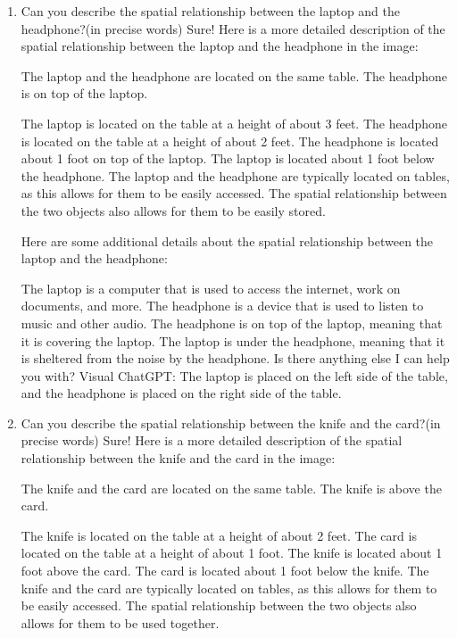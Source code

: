 \begin{enumerate}
    \item Can you describe the spatial relationship between the laptop and the headphone?(in precise words)
    \subitem 
    Sure! Here is a more detailed description of the spatial relationship between the laptop and the headphone in the image:
    
    The laptop and the headphone are located on the same table. The headphone is on top of the laptop.
    
    The laptop is located on the table at a height of about 3 feet.
    The headphone is located on the table at a height of about 2 feet.
    The headphone is located about 1 foot on top of the laptop.
    The laptop is located about 1 foot below the headphone.
    The laptop and the headphone are typically located on tables, as this allows for them to be easily accessed. The spatial relationship between the two objects also allows for them to be easily stored.
    
    Here are some additional details about the spatial relationship between the laptop and the headphone:
    
    The laptop is a computer that is used to access the internet, work on documents, and more.
    The headphone is a device that is used to listen to music and other audio.
    The headphone is on top of the laptop, meaning that it is covering the laptop.
    The laptop is under the headphone, meaning that it is sheltered from the noise by the headphone.
    Is there anything else I can help you with?
    \subitem Visual ChatGPT: The laptop is placed on the left side of the table, and the headphone is placed on the right side of the table.
    \item Can you describe the spatial relationship between the knife and the card?(in precise words)
    \subitem 
    Sure! Here is a more detailed description of the spatial relationship between the knife and the card in the image:
    
    The knife and the card are located on the same table. The knife is above the card.
    
    The knife is located on the table at a height of about 2 feet.
    The card is located on the table at a height of about 1 foot.
    The knife is located about 1 foot above the card.
    The card is located about 1 foot below the knife.
    The knife and the card are typically located on tables, as this allows for them to be easily accessed. The spatial relationship between the two objects also allows for them to be used together.
    

\end{enumerate}

